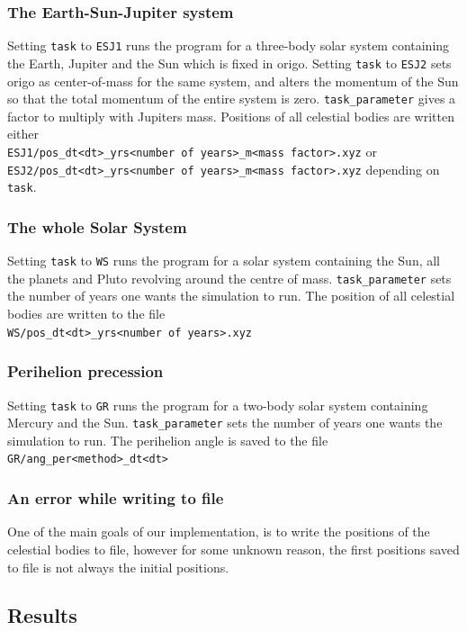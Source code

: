 \documentclass{article}
\begin{document}
\subsubsection{The Earth-Sun-Jupiter system}
Setting \texttt{task} to \texttt{ESJ1} runs the program for a three-body solar system containing the Earth, Jupiter and the Sun which is fixed in origo. Setting \texttt{task} to \texttt{ESJ2} sets origo as center-of-mass for the same system, and alters the momentum of the Sun so that the total momentum of the entire system is zero. \texttt{task\_parameter} gives a factor to multiply with Jupiters mass.
Positions of all celestial bodies are written either \\ \texttt{ESJ1/pos\_dt<dt>\_yrs<number of years>\_m<mass factor>.xyz} or \\
\texttt{ESJ2/pos\_dt<dt>\_yrs<number of years>\_m<mass factor>.xyz} depending on \texttt{task}.
\subsubsection{The whole Solar System}
Setting \texttt{task} to \texttt{WS} runs the program for a solar system containing the Sun, all the planets and Pluto revolving around the centre of mass. \texttt{task\_parameter} sets the number of years one wants the simulation to run. The position of all celestial bodies are written to the file \\ 
\texttt{WS/pos\_dt<dt>\_yrs<number of years>.xyz}
\subsubsection{Perihelion precession}
Setting \texttt{task} to \texttt{GR} runs the program for a two-body solar system containing Mercury and the Sun. \texttt{task\_parameter} sets the number of years one wants the simulation to run. The perihelion angle is saved to the file
\texttt{GR/ang\_per<method>\_dt<dt>}

\subsubsection{An error while writing to file}
One of the main goals of our implementation, is to write the positions of the celestial bodies to file, however for some unknown reason, the first positions saved to file is not always the initial positions.
\subsection{Results}
\end{document}
